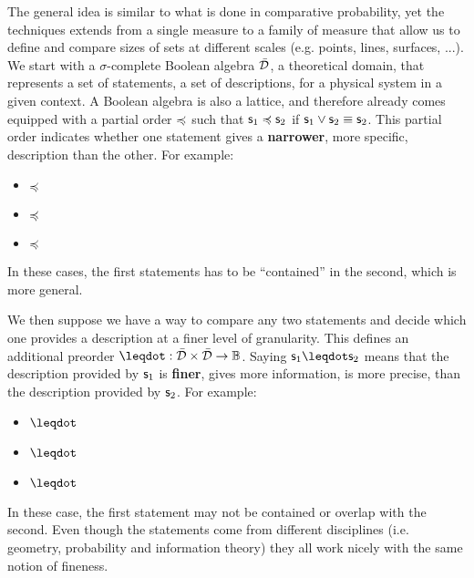 \documentclass{article}
\begin{document}
The general idea is similar to what is done in comparative probability, yet the techniques extends from a single measure to a family of measure that allow us to define and compare sizes of sets at different scales (e.g. points, lines, surfaces, ...). We start with a $\sigma$-complete Boolean algebra $\bar{\mathcal{D}}$, a theoretical domain, that represents a set of statements, a set of descriptions, for a physical system in a given context. A Boolean algebra is also a lattice, and therefore already comes equipped with a partial order $\preccurlyeq$ such that $\mathsf{s}_1 \preccurlyeq \mathsf{s}_2$ if $\mathsf{s}_1 \vee \mathsf{s}_2 \equiv \mathsf{s}_2$. This partial order indicates whether one statement gives a \textbf{narrower}, more specific, description than the other. For example:
\begin{itemize}
    \item {} $\preccurlyeq$ 
    \item {} $\preccurlyeq$ 
    \item {} $\preccurlyeq$ 
\end{itemize}
In these cases, the first statements has to be ``contained'' in the second, which is more general.

We then suppose we have a way to compare any two statements and decide which one provides a description at a finer level of granularity. This defines an additional preorder $\finer : \tdomain \times \tdomain \to \mathbb{B}$. Saying $\stmt_1 \finer \stmt_2$ means that the description provided by $\mathsf{s}_1$ is \textbf{finer}, gives more information, is more precise, than the description provided by $\mathsf{s}_2$. For example:
\begin{itemize}
    \item {} $\finer$ 
    \item {} $\finer$ 
    \item {} $\finer$ 
\end{itemize}
In these case, the first statement may not be contained or overlap with the second. Even though the statements come from different disciplines (i.e. geometry, probability and information theory) they all work nicely with the same notion of fineness.
\end{document}
